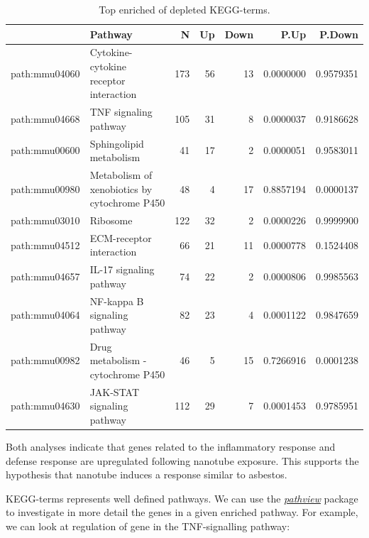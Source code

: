 \documentclass[9pt,a4paper,]{extarticle}
\begin{document}
\begin{table}[t]

\caption{\label{tab:kegga}Top enriched of depleted KEGG-terms.}
\centering
\begin{tabular}{l|l|r|r|r|r|r}
\hline
  & Pathway & N & Up & Down & P.Up & P.Down\\
\hline
path:mmu04060 & Cytokine-cytokine receptor interaction & 173 & 56 & 13 & 0.0000000 & 0.9579351\\
\hline
path:mmu04668 & TNF signaling pathway & 105 & 31 & 8 & 0.0000037 & 0.9186628\\
\hline
path:mmu00600 & Sphingolipid metabolism & 41 & 17 & 2 & 0.0000051 & 0.9583011\\
\hline
path:mmu00980 & Metabolism of xenobiotics by cytochrome P450 & 48 & 4 & 17 & 0.8857194 & 0.0000137\\
\hline
path:mmu03010 & Ribosome & 122 & 32 & 2 & 0.0000226 & 0.9999900\\
\hline
path:mmu04512 & ECM-receptor interaction & 66 & 21 & 11 & 0.0000778 & 0.1524408\\
\hline
path:mmu04657 & IL-17 signaling pathway & 74 & 22 & 2 & 0.0000806 & 0.9985563\\
\hline
path:mmu04064 & NF-kappa B signaling pathway & 82 & 23 & 4 & 0.0001122 & 0.9847659\\
\hline
path:mmu00982 & Drug metabolism - cytochrome P450 & 46 & 5 & 15 & 0.7266916 & 0.0001238\\
\hline
path:mmu04630 & JAK-STAT signaling pathway & 112 & 29 & 7 & 0.0001453 & 0.9785951\\
\hline
\end{tabular}
\end{table}

Both analyses indicate that genes related to the inflammatory response and defense response are upregulated following nanotube exposure. This supports the hypothesis that nanotube induces a response similar to asbestos.

KEGG-terms represents well defined pathways. We can use the \emph{\href{https://bioconductor.org/packages/3.8/pathview}{pathview}} package\citep{Luo2013} to investigate in more detail the genes in a given enriched pathway. For example, we can look at regulation of gene in the TNF-signalling pathway:
\end{document}
